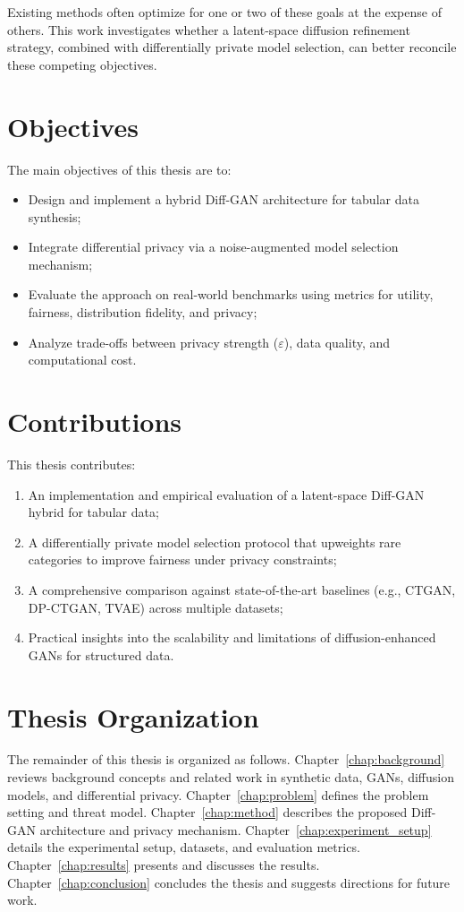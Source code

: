 Existing methods often optimize for one or two of these goals at the expense of others. This work investigates whether a latent-space diffusion refinement strategy, combined with differentially private model selection, can better reconcile these competing objectives.

\section{Objectives}
\label{sec:objectives}

The main objectives of this thesis are to:
\begin{itemize}
    \item Design and implement a hybrid Diff-GAN architecture for tabular data synthesis;
    \item Integrate differential privacy via a noise-augmented model selection mechanism;
    \item Evaluate the approach on real-world benchmarks using metrics for utility, fairness, distribution fidelity, and privacy;
    \item Analyze trade-offs between privacy strength ($\varepsilon$), data quality, and computational cost.
\end{itemize}

\section{Contributions}
\label{sec:contributions}

This thesis contributes:
\begin{enumerate}
    \item An implementation and empirical evaluation of a latent-space Diff-GAN hybrid for tabular data;
    \item A differentially private model selection protocol that upweights rare categories to improve fairness under privacy constraints;
    \item A comprehensive comparison against state-of-the-art baselines (e.g., CTGAN, DP-CTGAN, TVAE) across multiple datasets;
    \item Practical insights into the scalability and limitations of diffusion-enhanced GANs for structured data.
\end{enumerate}

\section{Thesis Organization}
\label{sec:thesis_structure}

The remainder of this thesis is organized as follows.  
Chapter~\ref{chap:background} reviews background concepts and related work in synthetic data, GANs, diffusion models, and differential privacy.  
Chapter~\ref{chap:problem} defines the problem setting and threat model.  
Chapter~\ref{chap:method} describes the proposed Diff-GAN architecture and privacy mechanism.  
Chapter~\ref{chap:experiment_setup} details the experimental setup, datasets, and evaluation metrics.  
Chapter~\ref{chap:results} presents and discusses the results.  
Chapter~\ref{chap:conclusion} concludes the thesis and suggests directions for future work.